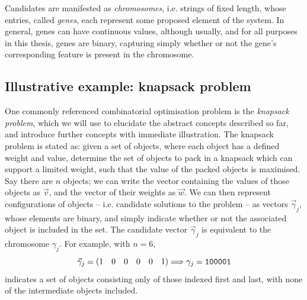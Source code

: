 Candidates are manifested as \emph{\glspl{chromosome}}, i.e. strings of fixed length, 
    whose entries, called  \emph{\glspl{gene}}, each represent some proposed element of the system.
In general, \glspl{gene} can have continuous values, although usually, and for all purposes in this thesis, 
    genes are binary, capturing simply whether or not the \gls{gene}'s corresponding feature is present 
    in the \gls{chromosome}. 

\subsection{Illustrative example: knapsack problem}\label{sec:knapsack}
One commonly referenced combinatorial optimisation problem is the \emph{knapsack problem},
    which we will use to elucidate the abstract concepts described so far, 
    and introduce further concepts with immediate illustration. 
The knapsack problem is stated as:
    given a set of objects, where each object has a defined weight and value, 
    determine the set of objects to pack in a knapsack which can support a limited weight, 
    such that the value of the packed objects is maximised. 
Say there are $n$ objects;
    we can write the vector containing the values of those objects as $\vec{v}$, 
    and the vector of their weights as $\vec{w}$. 
We can then represent configurations of objects -- i.e. candidate solutions to the problem -- 
    as vectors $\vec{\gamma}_j$, whose elements are binary, 
    and simply indicate whether or not the associated object is included in the set. 
The candidate vector $\vec{\gamma}_j$ is equivalent to the chromosome $\gamma_j$. 
For example, with $n=6$,
\begin{equation}
    \vec{\gamma}_j = \begin{matrix}(1 & 0 & 0 & 0 & 0 & 1)\end{matrix} \Longrightarrow  \gamma_j = \texttt{100001} 
\end{equation} 
indicates a set of objects consisting only of those indexed first and last, with none of the intermediate objects included. 
